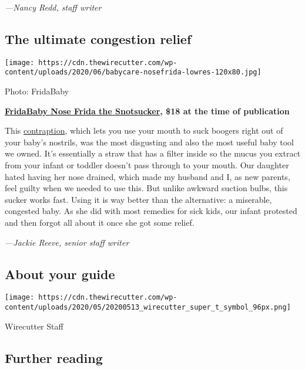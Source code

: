 \emph{---Nancy Redd, staff writer}

\hypertarget{the-ultimate-congestion-relief}{%
\subsection{The ultimate congestion
relief}\label{the-ultimate-congestion-relief}}

\texttt{[image: https://cdn.thewirecutter.com/wp-content/uploads/2020/06/babycare-nosefrida-lowres-120x80.jpg]}

Photo: FridaBaby

\textbf{\href{https://www.nytimes3xbfgragh.onion/wirecutter/out/link/39076/162831/4/115964/?merchant=Amazon}{FridaBaby
Nose Frida the Snotsucker}, \$18 at the time of publication}

This
\href{https://www.nytimes3xbfgragh.onion/wirecutter/out/link/39076/162831/4/115964/?merchant=Amazon}{contraption},
which lets you use your mouth to suck boogers right out of your baby's
nostrils, was the most disgusting and also the most useful baby tool we
owned. It's essentially a straw that has a filter inside so the mucus
you extract from your infant or toddler doesn't pass through to your
mouth. Our daughter hated having her nose drained, which made my husband
and I, as new parents, feel guilty when we needed to use this. But
unlike awkward suction bulbs, this sucker works fast. Using it is way
better than the alternative: a miserable, congested baby. As she did
with most remedies for sick kids, our infant protested and then forgot
all about it once she got some relief.

\emph{---Jackie Reeve, senior staff writer}

\hypertarget{about-your-guide}{%
\subsection{About your guide}\label{about-your-guide}}

\texttt{[image: https://cdn.thewirecutter.com/wp-content/uploads/2020/05/20200513\_wirecutter\_super\_t\_symbol\_96px.png]}

Wirecutter Staff

\hypertarget{further-reading}{%
\subsection{Further reading}\label{further-reading}}

